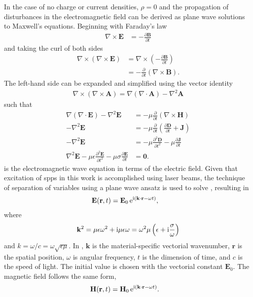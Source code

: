 In the case of no charge or current densities, $\rho=0$ and
the propagation of disturbances in the electromagnetic field can be derived
as plane wave solutions to Maxwell's equations.  Beginning with Faraday's law
\begin{align}
\nabla \times \mathbf{E} &= -\frac{\partial \mathbf{B}} {\partial t}
\end{align}
and taking the curl of both sides
\begin{align}
\nabla \times
\left(\nabla\times\mathbf{E}\right)&=\nabla\times\left(-\frac{\partial\mathbf{B}}{\partial
t}\right)\\
&=-\frac{\partial}{\partial t}\left(\nabla \times \mathbf{B}\right).
\end{align}
The left-hand side can be expanded and simplified using the vector identity
\begin{align}
\nabla \times \left( \nabla \times \mathbf{A} \right) = \nabla \left(
\nabla \cdot \mathbf{A} \right) - \nabla^2 \mathbf{A}
\end{align}
such that
\begin{align}
\nabla\left(\nabla\cdot\mathbf{E}\right)-\nabla^2\mathbf{E}
&=-\mu\frac{\partial}{\partial t}\left(\nabla \times \mathbf{H}\right)\\
-\nabla^2\mathbf{E}&=-\mu\frac{\partial}{\partial t}\left( \frac{\partial \mathbf{D}}{\partial t} + \mathbf{J}\right) \\
-\nabla^2\mathbf{E}&=-\mu\frac{\partial^2 \mathbf{D}}{\partial t^2} -\mu\frac{\partial\mathbf{J}}{\partial t} \\
\nabla^2\mathbf{E} -\mu\epsilon\frac{\partial^2 \mathbf{E}}{\partial t^2} -\mu\sigma\frac{\partial\mathbf{E}}{\partial t}  &= \mathbf{0}.
\label{eqn:ewe}
\end{align}
 is the electromagnetic wave equation in terms of the
electric field.  Given that excitation of \glspl{spp} in this work is accomplished
using laser beams, the technique of separation of variables using a plane
wave ansatz is used to solve , resulting in
\begin{align}
 \mathbf{E} ( \mathbf{r}, t ) &= \mathbf{E}_0\, {\mathrm{e}}^{{\mathrm{i}} (\mathbf{k}
 \cdot \mathbf{r} - \omega t )},
\label{eqn:planewaves}
\end{align}
where
\begin{equation}
 \mathbf{k}^2 = \mu \epsilon \omega^2 + {\mathrm{i}} \mu \epsilon \omega = \omega^2 \mu \left(\epsilon + {\mathrm{i}} \frac{\sigma}{\omega}\right)
\label{eqn:planewavedispersion}
\end{equation}
and $k=\omega/c=\omega\sqrt{\epsilon\mu}$.  In ,
$\mathbf{k}$ is the material-specific vectorial wavenumber, $\mathbf{r}$ is the
spatial position, $\omega$ is angular frequency, $t$ is
the dimension of time, and $c$ is the speed of light.
The initial value is chosen with the vectorial constant $\mathbf{E}_0$.
The magnetic field follows the same form,
\begin{align}
 \mathbf{H} ( \mathbf{r}, t ) &= \mathbf{H}_0\, {\mathrm{e}}^{{\mathrm{i}} (\mathbf{k}
 \cdot \mathbf{r} - \omega t )}.
	\label{eqn:planewavesh}
\end{align}
